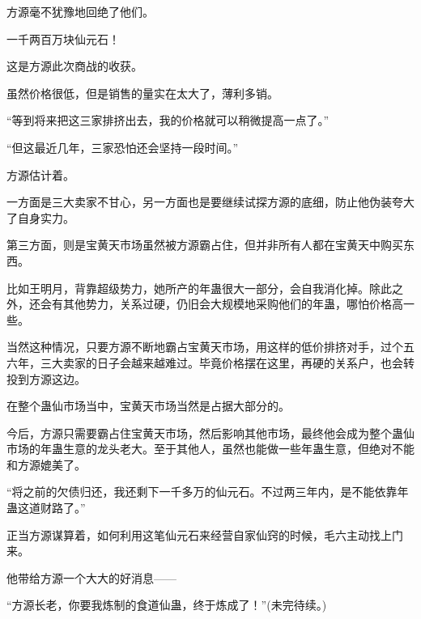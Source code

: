 \begin{this_body}
方源毫不犹豫地回绝了他们。

一千两百万块仙元石！

这是方源此次商战的收获。

虽然价格很低，但是销售的量实在太大了，薄利多销。

“等到将来把这三家排挤出去，我的价格就可以稍微提高一点了。”

“但这最近几年，三家恐怕还会坚持一段时间。”

方源估计着。

一方面是三大卖家不甘心，另一方面也是要继续试探方源的底细，防止他伪装夸大了自身实力。

第三方面，则是宝黄天市场虽然被方源霸占住，但并非所有人都在宝黄天中购买东西。

比如王明月，背靠超级势力，她所产的年蛊很大一部分，会自我消化掉。除此之外，还会有其他势力，关系过硬，仍旧会大规模地采购他们的年蛊，哪怕价格高一些。

当然这种情况，只要方源不断地霸占宝黄天市场，用这样的低价排挤对手，过个五六年，三大卖家的日子会越来越难过。毕竟价格摆在这里，再硬的关系户，也会转投到方源这边。

在整个蛊仙市场当中，宝黄天市场当然是占据大部分的。

今后，方源只需要霸占住宝黄天市场，然后影响其他市场，最终他会成为整个蛊仙市场的年蛊生意的龙头老大。至于其他人，虽然也能做一些年蛊生意，但绝对不能和方源媲美了。

“将之前的欠债归还，我还剩下一千多万的仙元石。不过两三年内，是不能依靠年蛊这道财路了。”

正当方源谋算着，如何利用这笔仙元石来经营自家仙窍的时候，毛六主动找上门来。

他带给方源一个大大的好消息——

“方源长老，你要我炼制的食道仙蛊，终于炼成了！”(未完待续。)

\end{this_body}


